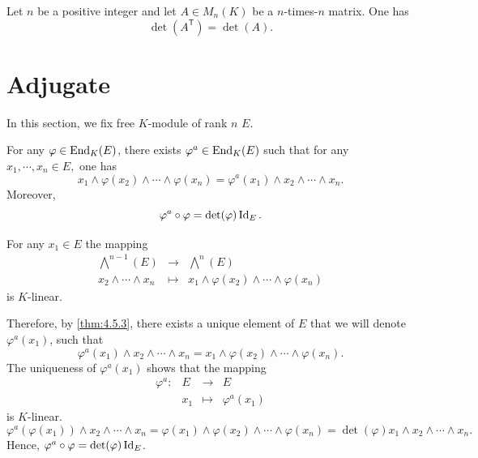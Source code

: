 \begin{corollaryenv}\label{thm:Matrix.det_transpose}
    Let $n$ be a positive integer and let $A \in M_n(K)$ be a $n$-times-$n$ matrix.
    One has
    $$ \det (A^{\mathsf{T}}) = \det (A).$$
\end{corollaryenv}


\section{Adjugate}

In this section, we fix free $K$-module of rank $n$ $E$.

\begin{theoremenv}\label{thm:4.7.1}
    For any $\varphi \in \operatorname{\mathrm{End}}_K (E)$, there exists $\varphi^a \in \operatorname{\mathrm{End}}_K (E)$ such that for any $x_1,\cdots,x_n \in E,$ one has
    $$ x_1 \wedge \varphi(x_2) \wedge \cdots \wedge \varphi(x_n) = \varphi^a (x_1) \wedge x_2 \wedge \cdots \wedge x_n.$$
    Moreover, 
    $$ \varphi^a \circ \varphi = \det (\varphi) \operatorname{\mathrm{Id}}_E.$$
\end{theoremenv}
\begin{proofenv}
    For any $x_1 \in E$ the mapping
    $$ \begin{array}{rcl}
        \bigwedge^{n-1} (E) & \longrightarrow & \bigwedge^n (E)\\
        x_2 \wedge \cdots \wedge x_n & \longmapsto & x_1 \wedge \varphi(x_2) \wedge \cdots \wedge \varphi(x_n)
    \end{array}$$
    is $K$-linear.
    \begin{center}
    \end{center}
    Therefore, by \ref{thm:4.5.3}, there exists a unique element of $E$ that we will denote $\varphi^a(x_1)$, such that 
    $$ \varphi^a(x_1) \wedge x_2 \wedge \cdots \wedge x_n = x_1 \wedge \varphi(x_2) \wedge \cdots \wedge \varphi(x_n).$$
    The uniqueness of $\varphi^a(x_1)$ shows that the mapping
    $$ \begin{array}{rrcl}
        \varphi^a : & E & \longrightarrow & E\\
        & x_1 & \longmapsto & \varphi^a(x_1)
        \end{array}$$
    is $K$-linear.
    $$ \varphi^a(\varphi(x_1)) \wedge x_2 \wedge \cdots \wedge x_n = \varphi(x_1) \wedge \varphi(x_2) \wedge \cdots \wedge \varphi(x_n) = \det (\varphi) x_1 \wedge x_2 \wedge \cdots \wedge x_n.$$
    Hence, $\varphi^a \circ \varphi = \det (\varphi) \operatorname{\mathrm{Id}}_E$.
\end{proofenv}

